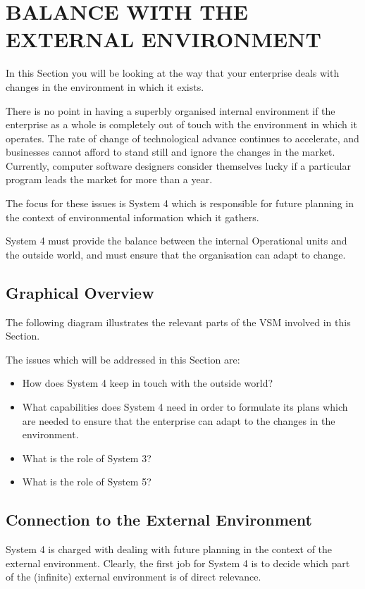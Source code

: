 \chapter{BALANCE WITH THE EXTERNAL ENVIRONMENT}
  \label{BALANCE WITH THE EXTERNAL ENVIRONMENT}
In this Section you will be looking at the way that your enterprise deals with changes in the environment in which it exists.

There is no point in having a superbly organised internal environment if the enterprise as a whole is completely out of touch with the environment in which it operates. The rate of change of technological advance continues to accelerate, and businesses cannot afford to stand still and ignore the changes in the market. Currently, computer software designers consider themselves lucky if a particular program leads the market for more than a year.

The focus for these issues is System 4 which is responsible for future planning in the context of environmental information which it gathers.

System 4 must provide the balance between the internal Operational units and the outside world, and must ensure that the organisation can adapt to change.

\section*{Graphical Overview}
The following diagram illustrates the relevant parts of the VSM involved in this Section.

The issues which will be addressed in this Section are:

\begin{itemize}
  \item How does System 4 keep in touch with the outside world?

  \item What capabilities does System 4 need in order to formulate its plans which are needed to ensure that the enterprise can adapt to the changes in the environment.

  \item What is the role of System 3?

  \item What is the role of System 5?

\end{itemize}

\section*{Connection to the External Environment}
System 4 is charged with dealing with future planning in the context of the external environment. Clearly, the first job for System 4 is to decide which part of the (infinite) external environment is of direct relevance.

